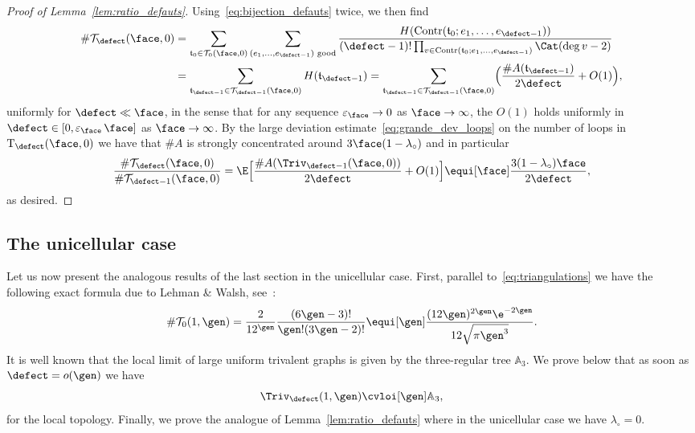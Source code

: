 \begin{proof}[Proof of Lemma~\ref{lem:ratio_defauts}]
Using~\eqref{eq:bijection_defauts} twice, we then find
\begin{align*}
\# \mathcal{T}_\defect(\face, 0)
&= \sum_{\mathfrak{t}_0 \in \mathcal{T}_0(\face, 0)} \sum_{(e_1, \dots, e_{\defect-1}) \text{ good}} \frac{H(\mathrm{Contr}(\mathfrak{t}_0 ; e_1, \dots, e_{ \defect-1}))}{(\defect-1)! \prod_{v \in \mathrm{Contr}(\mathfrak{t}_0 ; e_1, \dots, e_{\defect-1})} \Cat(\deg v - 2)}
\\
&= \sum_{ \mathfrak{t}_{ \defect-1} \in \mathcal{T}_{ \defect-1}(\face,0) } H(\mathfrak{t}_{\defect-1})
= \sum_{ \mathfrak{t}_{ \defect-1} \in \mathcal{T}_{ \defect-1}(\face,0)} \Bigl(\frac{\# A(\mathfrak{t}_{ \defect-1})}{2 \defect} + O(1)\Bigr),
\end{align*}
uniformly for $\defect \ll \face$, in the sense that for any sequence $\varepsilon_\face \to 0$ as $\face \to \infty$, the $O(1)$ holds uniformly in $\defect \in [0, \varepsilon_\face\, \face]$ as $\face \to \infty$.
By the large deviation estimate~\eqref{eq:grande_dev_loops} on the number of loops in $\mathrm{T}_{ \defect}(\face,0)$ we have that $\#A$ is strongly concentrated around $3\face (1-\lambda_{\circ})$ and in particular
\[
\frac{\# \mathcal{T}_\defect(\face, 0)}{\# \mathcal{T}_{\defect-1}(\face, 0)}
= \E\Bigl[\frac{\# A(\Triv_{ \defect-1}(\face,0))}{2 \defect} + O(1)\Bigr]
\equi[\face] \frac{ 3(1-\lambda_\circ) \face}{2 \defect},
\]
as desired.
\end{proof}

\subsection{The unicellular case}
\label{ssec:unicellularestimates}

Let us now present the analogous results of the last section in the unicellular case. First, parallel to~\eqref{eq:triangulations} we have the following exact formula due to Lehman \& Walsh, see~\cite[Eq.\,(9)]{WL72}:
\begin{equation}\label{eq:triangulations_high_gen}
\#\mathcal{T}_{0}(1,\gen) = \frac{2}{12^{\gen}} \frac{(6\gen-3)!}{\gen!(3\gen-2)!}
\equi[\gen] \frac{(12 \gen)^{2\gen} \e^{-2\gen}}{12 \sqrt{\pi \gen^3}}.
\end{equation}
It is well known that the local limit of large uniform trivalent graphs is given by the three-regular tree $\mathbb{A}_3$.
We prove below that as soon as $ \defect =o(\gen)$ we have
\begin{equation} \label{eq:convthree-regular}
\Triv_{ \defect}(1, \gen) \cvloi[\gen] \mathbb{A}_3,
\end{equation}
for the local topology. Finally, we prove the analogue of Lemma~\ref{lem:ratio_defauts} where in the unicellular case we have $\lambda_{\circ} =0$.

